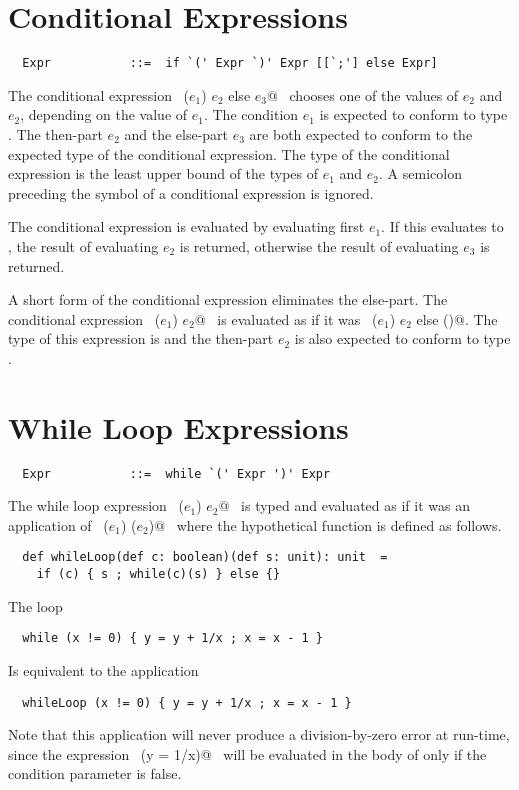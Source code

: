 \documentclass[a4paper,12pt,twoside,titlepage]{book}
\begin{document}
\section{Conditional Expressions}

\syntax\begin{lstlisting}
  Expr           ::=  if `(' Expr `)' Expr [[`;'] else Expr]
\end{lstlisting}

The conditional expression ~\lstinline@if ($e_1$) $e_2$ else $e_3$@~ chooses
one of the values of $e_2$ and $e_2$, depending on the
value of $e_1$. The condition $e_1$ is expected to
conform to type .  The then-part $e_2$ and the
else-part $e_3$ are both expected to conform to the expected
type of the conditional expression. The type of the conditional
expression is the least upper bound of the types of $e_1$ and
$e_2$.  A semicolon preceding the  symbol of a
conditional expression is ignored.

The conditional expression is evaluated by evaluating first
$e_1$. If this evaluates to , the result of
evaluating $e_2$ is returned, otherwise the result of
evaluating $e_3$ is returned.

A short form of the conditional expression eliminates the
else-part. The conditional expression ~\lstinline@if ($e_1$) $e_2$@~ is
evaluated as if it was ~\lstinline@if ($e_1$) $e_2$ else ()@.  The type of
this expression is  and the then-part
$e_2$ is also expected to conform to type .

\section{While Loop Expressions}

\syntax\begin{lstlisting}
  Expr           ::=  while `(' Expr ')' Expr
\end{lstlisting}

The while loop expression ~\lstinline@while ($e_1$) $e_2$@~ is typed and
evaluated as if it was an application of ~\lstinline@whileLoop ($e_1$) ($e_2$)@~ where
the hypothetical function  is defined as follows.

\begin{lstlisting}
  def whileLoop(def c: boolean)(def s: unit): unit  =
    if (c) { s ; while(c)(s) } else {}
\end{lstlisting}

\example The loop 
\begin{lstlisting}
  while (x != 0) { y = y + 1/x ; x = x - 1 }
\end{lstlisting}
Is equivalent to the application
\begin{lstlisting}
  whileLoop (x != 0) { y = y + 1/x ; x = x - 1 }
\end{lstlisting}
Note that this application will never produce a division-by-zero 
error at run-time, since the
expression ~\lstinline@(y = 1/x)@~ will be evaluated in the body of
 only if the condition parameter is false.
\end{document}
